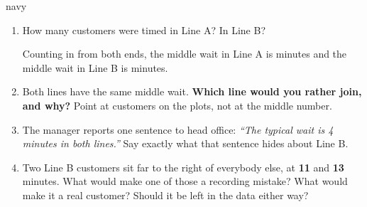 \documentclass[12pt]{article}
\newcommand{\answerspace}[2]{\par\nopagebreak\noindent\begin{minipage}[t][#1][t]{\linewidth}%
  \color{keyred}\bfseries #2\end{minipage}\par}
\begin{document}
\begin{scenariobox}{navy}
\normalsize
\begin{enumerate}[label=\textbf{\alph*.}, leftmargin=1.8em, itemsep=4pt]
  \item How many customers were timed in Line A? \blank{1.6cm} \quad In Line B? \blank{1.6cm}

        \vspace{3pt}
        Counting in from both ends, the middle wait in Line A is \blank{1.6cm} minutes and the
        middle wait in Line B is \blank{1.6cm} minutes.
  \item Both lines have the same middle wait. \textbf{Which line would you rather join, and
        why?} Point at customers on the plots, not at the middle number.
        \answerspace{1.6cm}{}
  \item The manager reports one sentence to head office: \emph{``The typical wait is 4 minutes
        in both lines.''} Say exactly what that sentence hides about Line B.
        \answerspace{1.6cm}{}
  \item Two Line B customers sit far to the right of everybody else, at \textbf{11} and
        \textbf{13} minutes. What would make one of those a recording mistake? What would make
        it a real customer? Should it be left in the data either way?
        \answerspace{2.0cm}{}
\end{enumerate}
\end{scenariobox}
\end{document}
